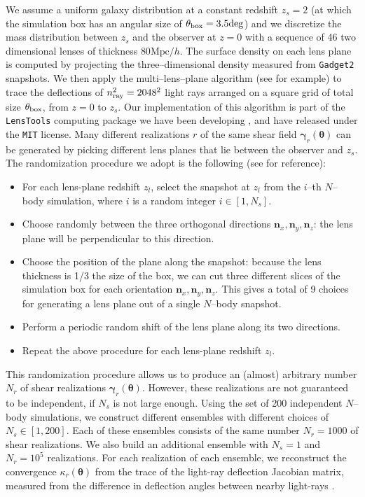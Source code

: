 \documentclass[reprint,aps,prd,superscriptaddress,showkeys,showpacs]{revtex4-1}
\newcommand{\bb}[1]{\mathbf{#1}}
\begin{document}
We assume a uniform galaxy distribution at a constant redshift $z_s=2$
(at which the simulation box has an angular size of $\theta_{\rm
  box}=3.5\mathrm{deg}$) and we discretize the mass distribution
between $z_s$ and the observer at $z=0$ with a sequence of 46 two
dimensional lenses of thickness $80\mathrm{Mpc}/h$. The surface
density on each lens plane is computed by projecting the
three--dimensional density measured from \texttt{Gadget2}
snapshots. We then apply the multi--lens--plane algorithm (see
\citep{RayTracingHartlap,RayTracingJain} for example) to trace the
deflections of $n_{\rm ray}^2=2048^2$ light rays arranged on a square grid
of total size $\theta_{\rm box}$, from $z=0$ to $z_s$. Our
implementation of this algorithm is part of the \texttt{LensTools}
computing package we have been developing \citep{LensTools}, and have
released under the \texttt{MIT} license. Many different realizations
$r$ of the same shear field $\pmb{\gamma}_r(\pmb{\theta})$ can be
generated by picking different lens planes that lie between the
observer and $z_s$. The randomization procedure we adopt is the
following (see \citep{Sato12} for reference):

\begin{itemize}
\item For each lens-plane redshift $z_l$, select the snapshot at $z_l$ from the $i$--th $N$--body simulation, where $i$ is a random integer $i\in [1,N_s]$.
\item Choose randomly between the three orthogonal directions ${\bb{n}_x,\bb{n}_y,\bb{n}_z}$: the lens plane will be perpendicular to this direction.
\item Choose the position of the plane along the snapshot: because the lens thickness is 1/3 the size of the box, we can cut three different slices of the simulation box for each orientation ${\bb{n}_x,\bb{n}_y,\bb{n}_z}$. This gives a total of 9 choices for generating a lens plane out of a single $N$--body snapshot.
\item Perform a periodic random shift of the lens plane along its two directions.
\item Repeat the above procedure for each lens-plane redshift $z_l$.
\end{itemize}  
%
This randomization procedure allows us to produce an (almost)
arbitrary number $N_r$ of shear realizations
$\pmb{\gamma}_r(\pmb{\theta})$. However, these realizations are not
guaranteed to be independent, if $N_s$ is not large enough. Using the
set of 200 independent $N$--body simulations, we construct different
ensembles with different choices of $N_s\in[1,200]$. Each of these
ensembles consists of the same number $N_r=1000$ of shear
realizations. We also build an additional ensemble with $N_s=1$ and
$N_r=10^5$ realizations. For each realization of each ensemble, we
reconstruct the convergence $\kappa_r(\pmb{\theta})$ from the trace of
the light-ray deflection Jacobian matrix, measured from the difference
in deflection angles between nearby light-rays
\citep{RayTracingHartlap,RayTracingJain,Sato12}.
\end{document}

